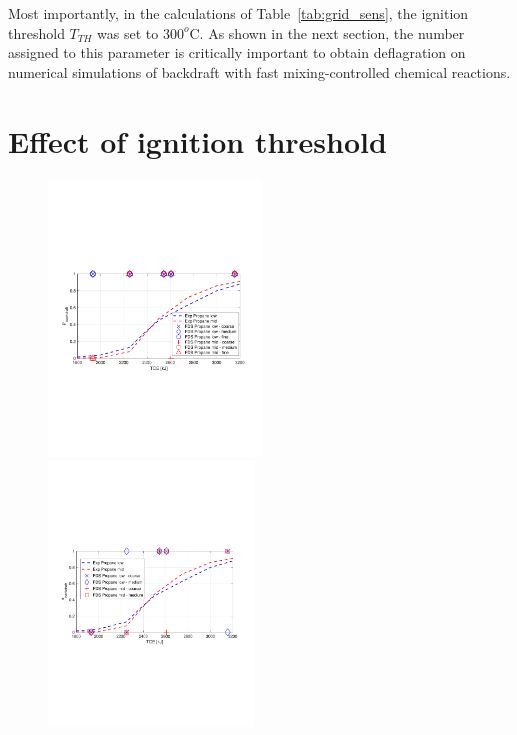 \documentclass[12pt,letterpaper]{article}
\begin{document}
\begin{flushleft}
Most importantly, in the calculations of Table~\ref{tab:grid_sens}, the ignition threshold $T_{TH}$ was set to $300^o$C. As shown in the next section, the number assigned to this parameter is critically important to obtain deflagration on numerical simulations of backdraft with fast mixing-controlled chemical reactions.

\section{Effect of ignition threshold}
\label{sec:ign_thr}

%
\begin{figure}[tb]
    \centering
    \includegraphics[trim = 14.5mm 85mm 17mm 80mm, clip,width=0.505\textwidth]{PbvsTCE_Cign_LES_Extinction_2_TTH300_Propaneb.pdf}
    \includegraphics[trim = 22mm 85mm 17mm 80mm, clip,width=0.485\textwidth]{PbvsTCE_Cign_LES_Extinction_2_TTH325_Propaneb.pdf}

\end{figure}
\end{flushleft}
\end{document}
